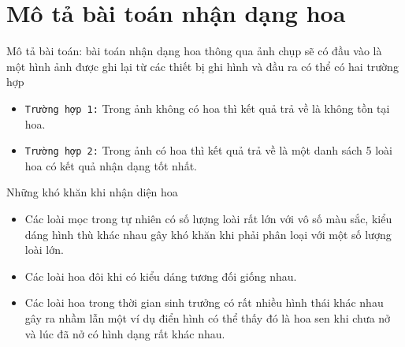 \documentclass[12pt]{report}
\begin{document}
		\section{Mô tả bài toán nhận dạng hoa}
		Mô tả bài toán: bài toán nhận dạng hoa thông qua ảnh chụp sẽ có đầu vào là một hình ảnh được ghi lại từ các thiết bị ghi hình và đầu ra có thể có hai trường hợp
		\begin{itemize}
			\item \texttt{Trường hợp 1:} Trong ảnh không có hoa thì kết quả trả về là không tồn tại hoa.
			\item \texttt{Trường hợp 2:} Trong ảnh có hoa thì kết quả trả về là một danh sách 5 loài hoa có kết quả nhận dạng tốt nhất.
		\end{itemize}
		Những khó khăn khi nhận diện hoa
		\begin{itemize}
			\item  Các loài mọc trong tự nhiên có số lượng loài rất lớn với vô số màu sắc, kiểu dáng hình thù khác nhau gây khó khăn khi phải phân loại với một số lượng loài lớn.
			\item  Các loài hoa đôi khi có kiểu dáng tương đối giống nhau.
			\item  Các loài hoa trong thời gian sinh trưởng có rất nhiều hình thái khác nhau gây ra nhầm lẫn một ví dụ điển hình có thể thấy đó là hoa sen khi chưa nở và lúc đã nở có hình dạng rất khác nhau.
		\end{itemize}
																																																																										
\end{document}

